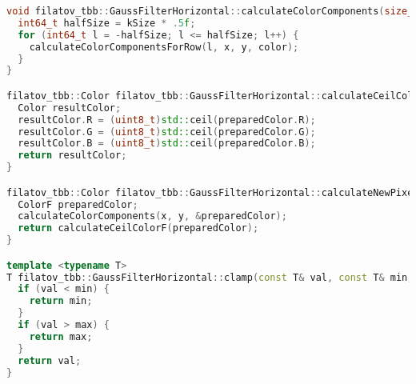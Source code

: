 \documentclass{report}
\begin{document}
\begin{lstlisting}[language=C++,caption=TBB версия]
void filatov_tbb::GaussFilterHorizontal::calculateColorComponents(size_t x, size_t y, ColorF* color) {
  int64_t halfSize = kSize * .5f;
  for (int64_t l = -halfSize; l <= halfSize; l++) {
    calculateColorComponentsForRow(l, x, y, color);
  }
}

filatov_tbb::Color filatov_tbb::GaussFilterHorizontal::calculateCeilColorF(ColorF preparedColor) {
  Color resultColor;
  resultColor.R = (uint8_t)std::ceil(preparedColor.R);
  resultColor.G = (uint8_t)std::ceil(preparedColor.G);
  resultColor.B = (uint8_t)std::ceil(preparedColor.B);
  return resultColor;
}

filatov_tbb::Color filatov_tbb::GaussFilterHorizontal::calculateNewPixelColor(size_t x, size_t y) {
  ColorF preparedColor;
  calculateColorComponents(x, y, &preparedColor);
  return calculateCeilColorF(preparedColor);
}

template <typename T>
T filatov_tbb::GaussFilterHorizontal::clamp(const T& val, const T& min, const T& max) {
  if (val < min) {
    return min;
  }
  if (val > max) {
    return max;
  }
  return val;
}
\end{lstlisting}

\newpage
\end{document}
